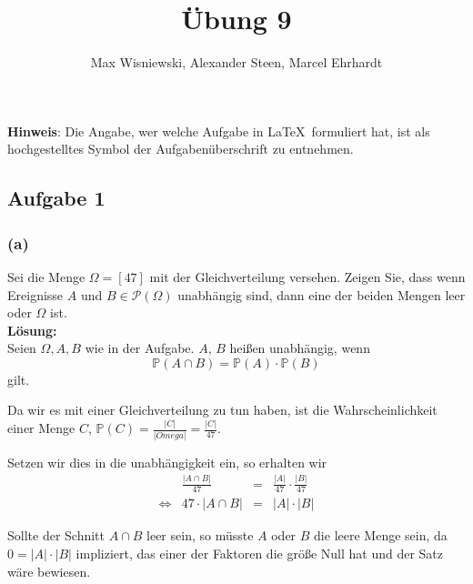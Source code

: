 \documentclass[11pt,a4paper,ngerman]{article}
\date{}
\title{Übung 9}
\author{Max Wisniewski\maxw, Alexander Steen\alex, Marcel Ehrhardt\marcel}
\newcommand{\Prob}{\mathbb{P}}
\begin{document}

\renewcommand{\figurename}{Figure}

\maketitle
\thispagestyle{fancy}

\begin{center}
\textbf{Hinweis}: Die Angabe, wer welche Aufgabe in \LaTeX\ formuliert hat, ist als hochgestelltes Symbol der Aufgabenüberschrift zu entnehmen.
\end{center}


\subsection*{Aufgabe 1}

\subsubsection*{(a)}
Sei die Menge $\Omega = [47]$ mit der Gleichverteilung versehen. Zeigen Sie, dass wenn Ereignisse $A$ und $B \in \mathcal{P}(\Omega)$ unabhängig sind,
dann eine der beiden Mengen leer oder $\Omega$ ist.\\

\textbf{Lösung:}\\

Seien $\Omega, A, B$ wie in der Aufgabe. $A$, $B$ heißen unabhängig, wenn
\[
    \Prob(A \cap B) = \Prob(A) \cdot \Prob(B)
\]
gilt.

Da wir es mit einer Gleichverteilung zu tun haben, ist die Wahrscheinlichkeit einer Menge $C$, $\Prob(C) = \frac{|C|}{|Omega|} = \frac{|C|}{47}$.

Setzen wir dies in die unabhängigkeit ein, so erhalten wir
\[
    \begin{array}{lrcl}
        &\frac{\left| A \cap B \right|}{47} &=& \frac{|A|}{47} \cdot \frac{|B|}{47}\\
        \Leftrightarrow & 47 \cdot \left| A \cap B \right| &=& |A| \cdot |B|
    \end{array}
\]

Sollte der Schnitt $A \cap B$ leer sein, so müsste $A$ oder $B$ die leere Menge sein, da $0 = |A| \cdot |B|$ impliziert, das einer der Faktoren die größe Null hat
und der Satz wäre bewiesen.\\
\end{document}
